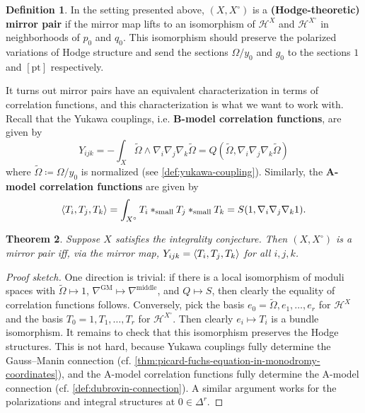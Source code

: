 \documentclass{report}
\theoremstyle{plain}
\newtheorem{theorem}{Theorem}[section]
\theoremstyle{definition}
\newtheorem{definition}[theorem]{Definition}
\theoremstyle{remark}
\newcommand{\cH}{\mathcal{H}}
\newcommand{\pt}{\mathrm{pt}}
\DeclarePairedDelimiter{\inner}{\langle}{\rangle}
\begin{document}
\begin{definition}
  In the setting presented above, $(X, X^\circ)$ is a {\bf
    (Hodge-theoretic) mirror pair} if the mirror map lifts to an
  isomorphism of $\cH^X$ and $\cH^{X^\circ}$ in neighborhoods of $p_0$
  and $q_0$. This isomorphism should preserve the polarized variations
  of Hodge structure and send the sections $\Omega/y_0$ and $g_0$ to
  the sections $1$ and $[\pt]$ respectively.
\end{definition}

It turns out mirror pairs have an equivalent characterization in terms
of correlation functions, and this characterization is what we want to
work with. Recall that the Yukawa couplings, i.e. {\bf B-model
  correlation functions}, are given by
\[ Y_{ijk} = -\int_X \tilde\Omega \wedge \nabla_i \nabla_j \nabla_k \tilde\Omega = Q(\tilde\Omega, \nabla_i \nabla_j \nabla_k \tilde\Omega) \]
where $\tilde\Omega \coloneqq \Omega/y_0$ is normalized (see
\ref{def:yukawa-coupling}). Similarly, the {\bf A-model correlation
  functions} are given by
\[ \inner{T_i, T_j, T_k} = \int_{X^\circ} T_i *_{\text{small}} T_j *_{\text{small}} T_k = S(1, \nabla_i \nabla_j \nabla_k 1). \]

\begin{theorem} \label{thm:mirror-pair-correlation-functions}
  Suppose $X$ satisfies the integrality conjecture. Then $(X,
  X^\circ)$ is a mirror pair iff, via the mirror map, $Y_{ijk} =
  \inner{T_i, T_j, T_k}$ for all $i,j,k$.
\end{theorem}

\begin{proof}[Proof sketch]
  One direction is trivial: if there is a local isomorphism of moduli
  spaces with $\tilde\Omega \mapsto 1$, $\nabla^{\text{GM}} \mapsto
  \nabla^{\text{middle}}$, and $Q \mapsto S$, then clearly the
  equality of correlation functions follows. Conversely, pick the
  basis $e_0 = \tilde\Omega, e_1, \ldots, e_r$ for $\cH^X$ and the
  basis $T_0 = 1, T_1, \ldots, T_r$ for $\cH^{X^\circ}$. Then clearly
  $e_i \mapsto T_i$ is a bundle isomorphism. It remains to check that
  this isomorphism preserves the Hodge structures. This is not hard,
  because Yukawa couplings fully determine the Gauss--Manin connection
  (cf. \ref{thm:picard-fuchs-equation-in-monodromy-coordinates}), and
  the A-model correlation functions fully determine the A-model
  connection (cf. \ref{def:dubrovin-connection}). A similar argument
  works for the polarizations and integral structures at $0 \in
  \Delta^r$.
\end{proof}
\end{document}

